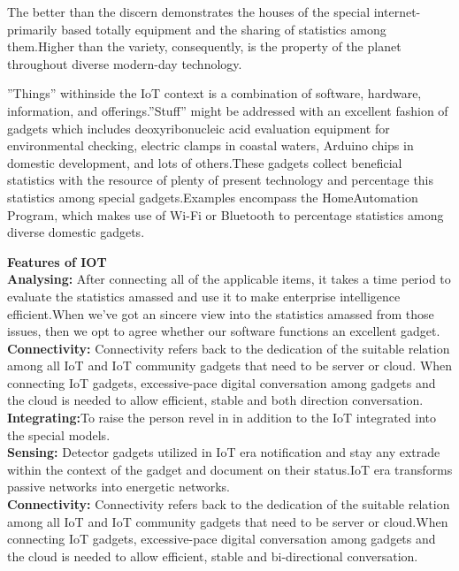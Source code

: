 \documentclass[12pt,a4paper]{article}
\begin{document}
\hspace{0.5cm}The better than the discern demonstrates the houses of the special internet-primarily based totally equipment
and the sharing of statistics among them.Higher than the variety, consequently, is the property
of the planet throughout diverse modern-day technology.

\hspace{0.5cm}”Things” withinside the IoT context is a combination of software, hardware, information, and offerings.”Stuff”
might be addressed with an excellent fashion of gadgets which includes deoxyribonucleic acid evaluation equipment for environmental checking, electric clamps in coastal waters, Arduino chips in domestic development,
and lots of others.These gadgets collect beneficial statistics with the resource of plenty of present
technology and percentage this statistics among special gadgets.Examples encompass the HomeAutomation Program, which makes use of Wi-Fi or Bluetooth to percentage statistics among diverse domestic
gadgets.

\vspace{0.1in}
\textbf{\large{Features of IOT}}\\

\textbf{\large{Analysing:}} After connecting all of the applicable items, it takes a time period to evaluate
the statistics amassed and use it to make enterprise intelligence efficient.When we've got an
sincere view into the statistics amassed from those issues, then we opt to agree whether
our software functions an excellent gadget.\\

\textbf{\large{Connectivity:}} Connectivity refers back to the dedication of the suitable relation among all IoT and IoT community gadgets that need to be server or cloud. When connecting IoT
gadgets, excessive-pace digital conversation among gadgets and the cloud is needed to allow efficient, stable and both direction conversation.\\

\textbf{\large{Integrating:}}To raise the person revel in in addition to the IoT integrated into the special models.\\

\textbf{\large{Sensing:}} Detector gadgets utilized in IoT era notification and stay any extrade within
the context of the gadget and document on their status.IoT era transforms passive networks
into energetic networks.\\

\textbf{\large{Connectivity:}} Connectivity refers back to the dedication of the suitable relation among all IoT and IoT community gadgets that need to be server or cloud.When connecting IoT
gadgets, excessive-pace digital conversation among gadgets and the cloud is needed to allow efficient, stable and bi-directional conversation.\\
\end{document}
